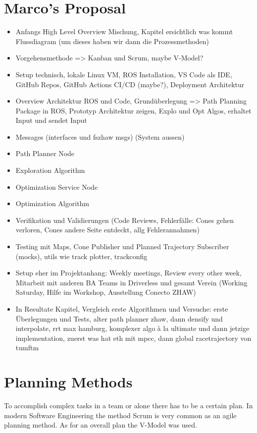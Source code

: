 \section{Marco's Proposal}
\begin{itemize}
    \item Anfangs High Level Overview Mischung, Kapitel ersichtlich was kommt Flussdiagram (um dieses haben wir dann die Prozessmethoden)
    \item Vorgehensmethode => Kanban und Scrum, maybe V-Model?
    \item Setup technisch, lokale Linux VM, ROS Installation, VS Code als IDE, GitHub Repos, GitHub Actions CI/CD (maybe?), Deployment Architektur
    \item Overview Architektur ROS und Code, Grundüberlegung => Path Planning Package in ROS, Prototyp Architektur zeigen, Explo und Opt Algos, erhaltet Input und sendet Input
    \item Messages (interfaces und fszhaw msgs) (System aussen)
    \item Path Planner Node
    \item Exploration Algorithm
    \item Optimization Service Node
    \item Optimization Algorithm
    \item Verifikation und Validierungen (Code Reviews, Fehlerfälle: Cones gehen verloren, Cones andere Seite entdeckt, allg Fehlerannahmen)
    \item Testing mit Maps, Cone Publisher und Planned Trajectory Subscriber (mocks), utils wie track plotter, trackconfig
    \item Setup eher im Projektanhang: Weekly meetings, Review every other week, Mitarbeit mit anderen BA Teams in Driverless und gesamt Verein (Working Saturday, Hilfe im Workshop, Ausstellung Conecto ZHAW)
    \item In Resultate Kapitel, Vergleich erste Algorithmen und Versuche: erste Überlegungen und Tests, alter path planner zhaw, dann densify und interpolate, rrt max hamburg, komplexer algo à la ultimate und dann jetzige implementation, zuerst was hat eth mit mpcc, dann global racetrajectory von tumftm
\end{itemize}

\section{Planning Methods} \label{sec:Planning Methods}
To accomplish complex tasks in a team or alone there has to be a certain plan. In modern Software Engineering the method Scrum is very common as an agile planning method. As for an overall plan the V-Model was used.

